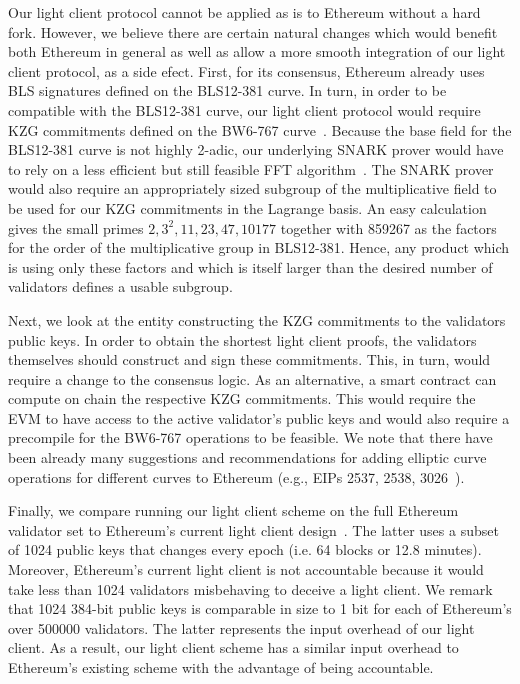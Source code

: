 Our light client protocol cannot be applied as is to Ethereum without a hard fork. However, we believe there are certain natural changes which would benefit both Ethereum in general  
as well as allow a more smooth integration of our light client protocol, as a side efect. First, for its consensus, Ethereum already uses BLS signatures defined on the BLS12-381 curve. In turn, in order to be compatible 
with the BLS12-381 curve, our light client protocol would require KZG commitments defined on the BW6-767 curve~\cite{bw6767}. Because the base field for the BLS12-381 curve is not highly 2-adic, 
our underlying SNARK prover would have to rely on a less efficient but still feasible FFT algorithm~\cite{bw6767}. The SNARK prover would also require 
an appropriately sized subgroup of the multiplicative field to be used for our KZG commitments in the Lagrange basis. An easy calculation gives the small primes $2,3^2,11,23,47,10177$ together with 859267 
as the factors for the order of the multiplicative group in BLS12-381. Hence, any product which is using only these factors and which is itself larger than the desired number of validators defines a usable subgroup.
 
Next, we look at the entity constructing the KZG commitments to the validators public keys. In order to obtain the shortest light client proofs, the validators themselves should construct and sign these commitments. 
This, in turn, would require a change to the consensus logic. As an alternative, a smart contract can compute on chain the respective KZG commitments.
This would require the EVM to have access to the active validator's public keys and would also require a precompile for the BW6-767 operations to be feasible.
We note that there have been already many suggestions and recommendations for adding elliptic curve operations for different curves to Ethereum (e.g., EIPs 2537, 2538, 3026~\cite{EIPs}). 
 
Finally, we compare running our light client scheme on the full Ethereum validator set to Ethereum's current light client design~\cite{ethlight}.
The latter uses a subset of 1024 public keys that changes every epoch (i.e. 64 blocks or 12.8 minutes). Moreover, Ethereum's current light client is not accountable because it would take less than 
1024 validators misbehaving to deceive a light client. We remark that 1024 384-bit public keys is comparable in size to 1 bit for each of Ethereum's over 500000 validators. 
The latter represents the input overhead of our light client. As a result, our light client scheme has a similar input overhead to Ethereum's existing scheme with the advantage of being accountable.


